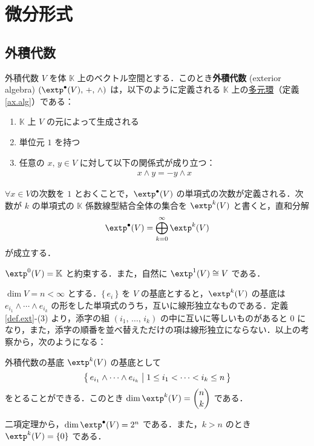 \documentclass[geometry_main]{subfiles}
\begin{document}
\setcounter{chapter}{3}

\chapter{微分形式}

\section{外積代数}

\begin{mydef}[label=def.ext]{外積代数}
$V$ を体 $\mathbb{K}$ 上のベクトル空間とする．このとき\textbf{外積代数} (exterior algebra) $\left( \extp^\bullet (V),\, +,\, \wedge \right)$ は，以下のように定義される $\mathbb{K}$ 上の\hyperref[ax.alg]{多元環}（定義\ref{ax.alg}）である：
	\begin{enumerate}
		\item $\mathbb{K}$ 上 $V$ の元によって生成される
		\item 単位元 $1$ を持つ
		\item 任意の $x,\, y \in V$ に対して以下の関係式が成り立つ：
		\begin{align}
			x \wedge y = - y \wedge x
		\end{align}
	\end{enumerate}
\end{mydef}

$\forall x \in V$の次数を $1$ とおくことで，$\extp^\bullet (V)$ の単項式の次数が定義される．次数が $k$ の単項式の $\mathbb{K}$ 係数線型結合全体の集合を $\extp^k (V)$ と書くと，直和分解
\begin{align}
	\extp^\bullet (V) = \bigoplus_{k=0}^\infty \extp^k (V)
\end{align}
が成立する．

\begin{marker} 
	$\extp^0(V) = \mathbb{K}$ と約束する．また，自然に $\extp^1(V) \cong V$ である．
\end{marker}


$\dim V = n < \infty$ とする．$\{\, e_i \, \}$ を $V$ の基底とすると，$\extp^k (V)$ の基底は $e_{i_1} \wedge \cdots \wedge e_{i_k}$ の形をした単項式のうち，互いに線形独立なものである．定義\ref{def.ext}-(3) より，添字の組 $(i_1,\, \dots ,\, i_k)$ の中に互いに等しいものがあると $0$ になり，また，添字の順番を並べ替えただけの項は線形独立にならない．以上の考察から，次のようになる：

\begin{mydef}[label=basisforext]{外積代数の基底}
	$\extp^k (V)$ の基底として
	\begin{align}
		\bigl\{\, e_{i_1} \wedge \cdots \wedge e_{i_k} \bigm| 1 \le i_1 < \cdots < i_k \le n \, \bigr\}
	\end{align}
	をとることができる．このとき $\displaystyle \dim \extp^k (V) = \binom{n}{k}$ である．	
\end{mydef}
二項定理から，$\dim \extp^\bullet (V) = 2^n$ である．また，$k > n$ のとき $\extp^k (V) = \{ 0 \}$ である．
\end{document}
